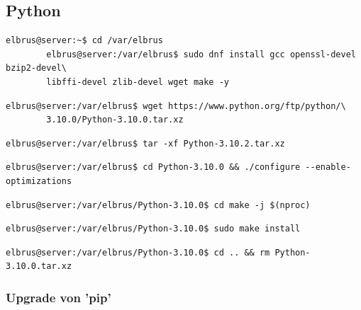 \documentclass{article}
\begin{document}
	\subsection{Python}
	
	\lstset{style=commands}
	\begin{lstlisting}[caption={Installieren von benötigten Packeten und Abhängigkeiten.}]
		elbrus@server:~$ cd /var/elbrus
		elbrus@server:/var/elbrus$ sudo dnf install gcc openssl-devel bzip2-devel\
		libffi-devel zlib-devel wget make -y
	\end{lstlisting}
	
	\lstset{style=commands}
	\begin{lstlisting}[caption={Herunterladen der Source Datei.}]
		elbrus@server:/var/elbrus$ wget https://www.python.org/ftp/python/\
		3.10.0/Python-3.10.0.tar.xz
	\end{lstlisting}
	
	\lstset{style=commands}
	\begin{lstlisting}[caption={Extrahieren der installierten Datei.}]
		elbrus@server:/var/elbrus$ tar -xf Python-3.10.2.tar.xz
	\end{lstlisting}
	
	\lstset{style=commands}
	\begin{lstlisting}[caption={Wechseln zu source Verzeichniss. Und ausführen des Konfigurations Scripts.}]
		elbrus@server:/var/elbrus$ cd Python-3.10.0 && ./configure --enable-optimizations
	\end{lstlisting}

	\lstset{style=commands}
	\begin{lstlisting}[caption={Starten des build Prozesses.}]
		elbrus@server:/var/elbrus/Python-3.10.0$ cd make -j $(nproc)
	\end{lstlisting}
	
	\lstset{style=commands}
	\begin{lstlisting}[caption={Installieren von Python.}]
		elbrus@server:/var/elbrus/Python-3.10.0$ sudo make install
	\end{lstlisting}

	\lstset{style=commands}
	\begin{lstlisting}[caption={Löschen der kompremierten Python Datei.}]
		elbrus@server:/var/elbrus/Python-3.10.0$ cd .. && rm Python-3.10.0.tar.xz
	\end{lstlisting}

	\subsubsection{Upgrade von 'pip'}
\end{document}
